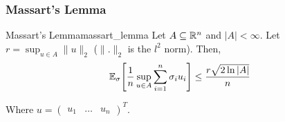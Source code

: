 \subsubsection{Massart's Lemma}
\begin{theorem}{Massart's Lemma}{massart_lemma}
    Let $A\subseteq \mathbb{R}^n$ and $|A|<\infty$. Let $r=\sup_{u\in A}\|u\|_2$ ($\|.\|_2$ is the $l^2$ norm). Then,
    \begin{align*}
        \mathbb{E}_\sigma\Bigg[ 
            \frac{1}{n} \sup_{u\in A}\sum_{i=1}^n \sigma_iu_i 
         \Bigg] \le \frac{r\sqrt{2\ln|A|}}{n}
    \end{align*}

    \noindent Where $u = \begin{pmatrix} u_1 & \dots & u_n \end{pmatrix}^T$.
\end{theorem}

